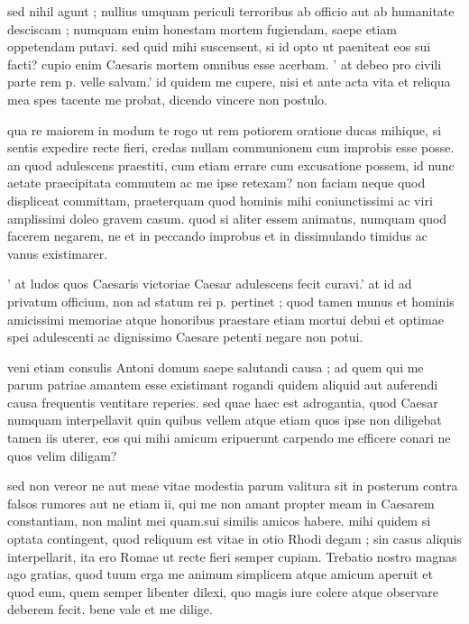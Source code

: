  sed nihil agunt ; nullius umquam periculi terroribus ab officio aut ab humanitate desciscam ; numquam enim honestam mortem fugiendam, saepe etiam oppetendam putavi. sed quid mihi suscensent, si id opto ut paeniteat eos sui facti? cupio enim Caesaris mortem omnibus esse acerbam. ' at debeo pro civili parte rem p. velle salvam.' id quidem me cupere, nisi et ante acta vita et reliqua mea spes tacente me probat, dicendo vincere non postulo.

 qua re maiorem in modum te rogo ut rem potiorem oratione ducas mihique, si sentis expedire recte fieri, credas nullam communionem cum improbis esse posse. an quod adulescens praestiti, cum etiam errare cum excusatione possem, id nunc aetate praecipitata commutem ac me ipse retexam? non faciam neque quod displiceat committam, praeterquam quod hominis mihi coniunctissimi ac viri amplissimi doleo gravem casum. quod si aliter essem animatus, numquam quod facerem negarem, ne et in peccando improbus et in dissimulando timidus ac vanus existimarer.

 ' at ludos quos Caesaris victoriae Caesar adulescens fecit curavi.' at id ad privatum officium, non ad statum rei p. pertinet ; quod tamen munus et hominis amicissimi memoriae atque honoribus praestare etiam mortui debui et optimae spei adulescenti ac dignissimo Caesare petenti negare non potui.

 veni etiam consulis Antoni domum saepe salutandi causa ; ad quem qui me parum patriae amantem esse existimant rogandi quidem aliquid aut auferendi causa frequentis ventitare reperies. sed quae haec est adrogantia, quod Caesar numquam interpellavit quin quibus vellem atque etiam quos ipse non diligebat tamen iis uterer, eos qui mihi amicum eripuerunt carpendo me efficere conari ne quos velim diligam?

 sed non vereor ne aut meae vitae modestia parum valitura sit in posterum contra falsos rumores aut ne etiam ii, qui me non amant propter meam in Caesarem constantiam, non malint mei quam.sui similis amicos habere. mihi quidem si optata contingent, quod reliquum est vitae in otio Rhodi degam ; sin casus aliquis interpellarit, ita ero Romae ut recte fieri semper cupiam. Trebatio nostro magnas ago gratias, quod tuum erga me animum simplicem atque amicum aperuit et quod eum, quem semper libenter dilexi, quo magis iure colere atque observare deberem fecit. bene vale et me dilige.
